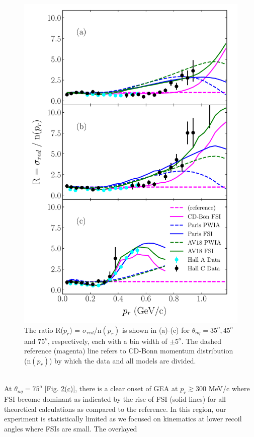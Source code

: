 \begin{figure}[h!]
\includegraphics[scale=0.5]{../prl_plots/PRL_plot2.pdf}
\caption{The ratio R($p_{r}$) = $\sigma_{red}$/n$(p_{r})$ is shown in (a)-(c) for $\theta_{nq}=35^{o}, 45^{o}$ and $75^{o}$, respectively, each with a bin width of $\pm 5^{o}$. The dashed reference (magenta) line refers to CD-Bonn momentum distribution (n$(p_{r})$) by which the data and all models are divided. }
\label{fig:fig2}
\end{figure} \\
\indent At $\theta_{nq}=75^{o}$ [Fig. \hyperref[fig:fig2]{2(c)}], there is a clear onset of GEA at $p_{r}\gtrsim300$ MeV/c where FSI become dominant as indicated by the rise of FSI (solid lines) for
all theoretical calculations as compared to the reference. In this region, our experiment is statistically limited as we focused on kinematics at lower recoil angles where FSIs are small. The overlayed

